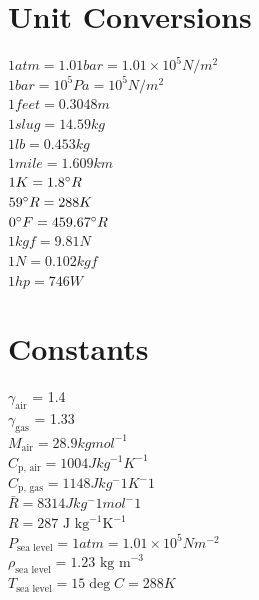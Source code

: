 \section{Unit Conversions}

$1 atm = 1.01bar = 1.01 \times 10^5 N/m^2$
\\
$1 bar = 10^5 Pa = 10^5 N/m^2$
\\
$1 feet = 0.3048m$
\\
$1 slug = 14.59kg$
\\
$1lb = 0.453kg $
\\
$1 mile = 1.609km$
\\
$1K = 1.8 \degree R$
\\
$59 \degree R = 288K $
\\
$ 0 \degree F = 459.67 \degree R$
\\
$1 kgf = 9.81N $
\\
$1N = 0.102 kgf$
\\
$1hp = 746W$

\section{Constants}

$\gamma_\text{air}$ = 1.4
\\
$\gamma_\text{gas}$ = 1.33
\\
$M_\text{air} = 28.9 kg mol^{-1}$
\\
$C_\text{p, air} = 1004 J kg^{-1} K^{-1}$
\\
$C_\text{p, gas} = 1148 J kg^-1 K^-1$
\\
$\bar{R} = 8314 J  kg^-1 mol^-1$
\\
$R = 287 \text{ J kg}^{-1} \text{K}^{-1}$
\\
$P_\text{sea level} = 1 atm = 1.01\times 10^5 Nm^{-2}$
\\
$\rho_\text{sea level} = 1.23 \text{ kg m}^{-3}$
\\
$T_\text{sea level} = 15 \deg C = 288K$